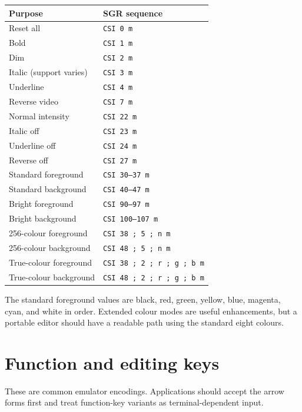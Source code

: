 \documentclass[
  oneside,
  openany]{book}
\begin{document}
\begin{longtable}[]{@{}ll@{}}
\toprule\noalign{}
Purpose & SGR sequence \\
\midrule\noalign{}
\endhead
\bottomrule\noalign{}
\endlastfoot
Reset all & \texttt{CSI\ 0\ m} \\
Bold & \texttt{CSI\ 1\ m} \\
Dim & \texttt{CSI\ 2\ m} \\
Italic (support varies) & \texttt{CSI\ 3\ m} \\
Underline & \texttt{CSI\ 4\ m} \\
Reverse video & \texttt{CSI\ 7\ m} \\
Normal intensity & \texttt{CSI\ 22\ m} \\
Italic off & \texttt{CSI\ 23\ m} \\
Underline off & \texttt{CSI\ 24\ m} \\
Reverse off & \texttt{CSI\ 27\ m} \\
Standard foreground & \texttt{CSI\ 30–37\ m} \\
Standard background & \texttt{CSI\ 40–47\ m} \\
Bright foreground & \texttt{CSI\ 90–97\ m} \\
Bright background & \texttt{CSI\ 100–107\ m} \\
256-colour foreground & \texttt{CSI\ 38\ ;\ 5\ ;\ n\ m} \\
256-colour background & \texttt{CSI\ 48\ ;\ 5\ ;\ n\ m} \\
True-colour foreground & \texttt{CSI\ 38\ ;\ 2\ ;\ r\ ;\ g\ ;\ b\ m} \\
True-colour background & \texttt{CSI\ 48\ ;\ 2\ ;\ r\ ;\ g\ ;\ b\ m} \\
\end{longtable}

The standard foreground values are black, red, green, yellow, blue,
magenta, cyan, and white in order. Extended colour modes are useful
enhancements, but a portable editor should have a readable path using
the standard eight colours.

\hypertarget{function-and-editing-keys}{%
\section{Function and editing keys}\label{function-and-editing-keys}}

These are common emulator encodings. Applications should accept the
arrow forms first and treat function-key variants as terminal-dependent
input.
\end{document}
